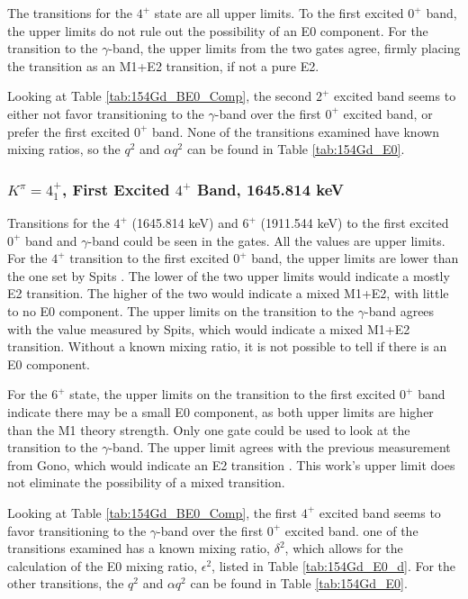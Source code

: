 The transitions for the $4^+$ state are all upper limits. To the first excited $0^+$ band, the upper limits do not rule out the possibility of an E0 component. For the transition to the $\gamma$-band, the upper limits from the two gates agree, firmly placing the transition as an M1+E2 transition, if not a pure E2.

Looking at Table \ref{tab:154Gd_BE0_Comp}, the second $2^+$ excited band seems to either not favor transitioning to the $\gamma$-band over the first $0^+$ excited band, or prefer the first excited $0^+$ band. None of the transitions examined have known mixing ratios, so the $q^2$ and $\alpha q^2$ can be found in Table \ref{tab:154Gd_E0}. 

\subsubsection{$K^{\pi}=4^+_1$, First Excited $4^+$ Band, 1645.814 keV}

Transitions for the $4^+$ (1645.814 keV) and $6^+$ (1911.544 keV) to the first excited $0^+$ band and $\gamma$-band could be seen in the gates. All the values are upper limits. For the $4^+$ transition to the first excited $0^+$ band, the upper limits are lower than the one set by Spits \citep{spits96:_154gd}. The lower of the two upper limits would indicate a mostly E2 transition. The higher of the two would indicate a mixed M1+E2, with little to no E0 component. The upper limits on the transition to the $\gamma$-band agrees with the value measured by Spits, which would indicate a mixed M1+E2 transition. Without a known mixing ratio, it is not possible to tell if there is an E0 component.

For the $6^+$ state, the upper limits on the transition to the first excited $0^+$ band indicate there may be a small E0 component, as both upper limits are higher than the M1 theory strength. Only one gate could be used to look at the transition to the $\gamma$-band. The upper limit agrees with the previous measurement from Gono, which would indicate an E2 transition \citep{gono74:_154gd_e0}. This work's upper limit does not eliminate the possibility of a mixed transition.

Looking at Table \ref{tab:154Gd_BE0_Comp}, the first $4^+$ excited band seems to favor transitioning to the $\gamma$-band over the first $0^+$ excited band. one of the transitions examined has a known mixing ratio, $\delta^2$, which allows for the calculation of the E0 mixing ratio, $\epsilon^2$, listed in Table \ref{tab:154Gd_E0_d}. For the other transitions, the $q^2$ and $\alpha q^2$ can be found in Table \ref{tab:154Gd_E0}. 